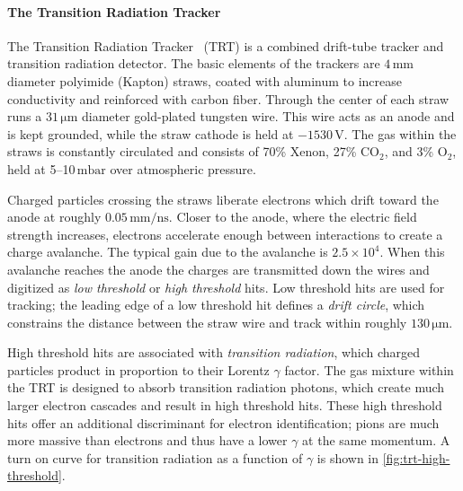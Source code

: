 \paragraph{The Transition Radiation Tracker}
The Transition Radiation Tracker~\cite{atlas-trt,atlas-trt2} (TRT) is a combined drift-tube tracker and transition radiation detector.
The basic elements of the trackers are $4\,\mathrm{mm}$ diameter polyimide (Kapton) straws, coated with aluminum to increase conductivity and reinforced with carbon fiber.
Through the center of each straw runs a $31\,\mathrm{\mu m}$ diameter gold-plated tungsten wire.
This wire acts as an anode and is kept grounded, while the straw cathode is held at $-1530\,\mathrm{V}$.
The gas within the straws is constantly circulated and consists of 70\% Xenon, 27\% CO$_2$, and 3\% O$_2$, held at 5--10$\,\mathrm{mbar}$ over atmospheric pressure.

Charged particles crossing the straws liberate electrons which drift toward the anode at roughly $0.05\,\mathrm{mm/ns}$. Closer to the anode, where the electric field strength increases, electrons accelerate enough between interactions to create a charge avalanche.
The typical gain due to the avalanche is $2.5 \times 10^4$.
When this avalanche reaches the anode the charges are transmitted down the wires and digitized as \emph{low threshold} or \emph{high threshold} hits.
Low threshold hits are used for tracking; the leading edge of a low threshold hit defines a \emph{drift circle}, which constrains the distance between the straw wire and track within roughly $130\,\mathrm{\mu m}$.

\begin{cfig}
  \caption[TRT high threshold probability for $e$, $\mu$, and pions]{
    Probability of a high-threshold hit in the TRT barrel section as a function of the $\gamma$ for $e$ (open squares), $\mu$ (full triangles) and pions (open circles) in the energy range 2--350$\,\gev$, as measured in the combined test-beam.}
  \label{fig:trt-high-threshold}
\end{cfig}

High threshold hits are associated with \emph{transition radiation}, which charged particles product in proportion to their Lorentz $\gamma$ factor.
The gas mixture within the TRT is designed to absorb transition radiation photons, which create much larger electron cascades and result in high threshold hits.
These high threshold hits offer an additional discriminant for electron identification; pions are much more massive than electrons and thus have a lower $\gamma$ at the same momentum. A turn on curve for transition radiation as a function of $\gamma$ is shown in \cref{fig:trt-high-threshold}.

